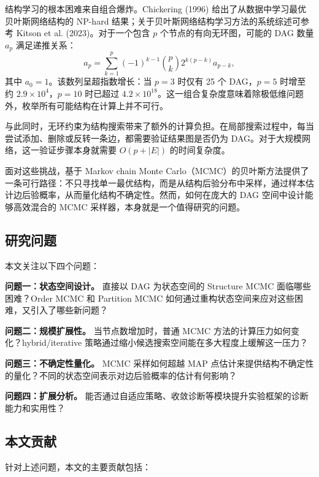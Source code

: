 \documentclass[UTF8,a4paper,12pt]{ctexart}
\begin{document}
结构学习的根本困难来自组合爆炸。Chickering (1996) 给出了从数据中学习最优贝叶斯网络结构的 NP-hard 结果\citep{chickering1996learning}；关于贝叶斯网络结构学习方法的系统综述可参考 Kitson et al. (2023)\citep{kitson2023survey}。对于一个包含 $p$ 个节点的有向无环图，可能的 DAG 数量 $a_p$ 满足递推关系：
\begin{equation}
a_p = \sum_{k=1}^{p}(-1)^{k-1}\binom{p}{k}2^{k(p-k)}a_{p-k},
\end{equation}
其中 $a_0 = 1$。该数列呈超指数增长：当 $p=3$ 时仅有 25 个 DAG，$p=5$ 时增至约 $2.9\times 10^4$，$p=10$ 时已超过 $4.2\times 10^{18}$。这一组合复杂度意味着除极低维问题外，枚举所有可能结构在计算上并不可行。

与此同时，无环约束为结构搜索带来了额外的计算负担。在局部搜索过程中，每当尝试添加、删除或反转一条边，都需要验证结果图是否仍为 DAG。对于大规模网络，这一验证步骤本身就需要 $O(p + |E|)$ 的时间复杂度。

面对这些挑战，基于 Markov chain Monte Carlo（MCMC）的贝叶斯方法提供了一条可行路径：不只寻找单一最优结构，而是从结构后验分布中采样，通过样本估计边后验概率，从而量化结构不确定性。然而，如何在庞大的 DAG 空间中设计能够高效混合的 MCMC 采样器，本身就是一个值得研究的问题。

\subsection{研究问题}

本文关注以下四个问题：

\textbf{问题一：状态空间设计。} 直接以 DAG 为状态空间的 Structure MCMC 面临哪些困难？Order MCMC 和 Partition MCMC 如何通过重构状态空间来应对这些困难，又引入了哪些新问题？

\textbf{问题二：规模扩展性。} 当节点数增加时，普通 MCMC 方法的计算压力如何变化？hybrid/iterative 策略通过缩小候选搜索空间能在多大程度上缓解这一压力？

\textbf{问题三：不确定性量化。} MCMC 采样如何超越 MAP 点估计来提供结构不确定性的量化？不同的状态空间表示对边后验概率的估计有何影响？

\textbf{问题四：扩展分析。} 能否通过自适应策略、收敛诊断等模块提升实验框架的诊断能力和实用性？

\subsection{本文贡献}

针对上述问题，本文的主要贡献包括：
\end{document}
